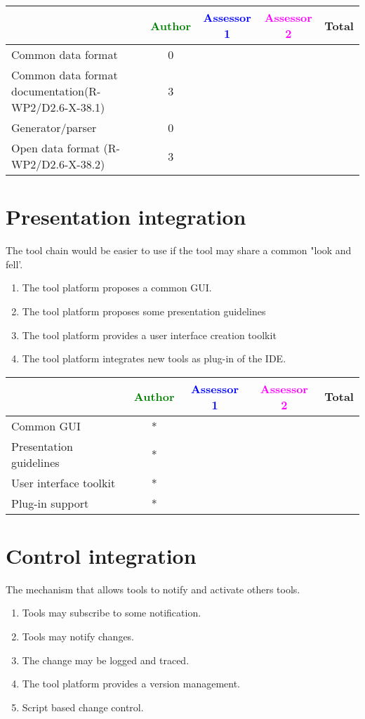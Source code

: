 \begin{tabular}{|l | c | c | c | c|} \hline
  & \textcolor{green}{Author} & \textcolor{blue}{Assessor 1} &  \textcolor{magenta}{Assessor 2} & Total \\
  \hline Common data format& 0
  &                 &                  &\\
  \hline Common data format documentation(R-WP2/D2.6-X-38.1) & 3
  &                 &                  &\\
  \hline Generator/parser & 0
  &                 &                  &\\
  \hline Open data format (R-WP2/D2.6-X-38.2)& 3
  &                 &                  &\\
  \hline
\end{tabular}



\section{Presentation integration}
The tool chain would be easier to use if the tool may share a common
"look and fell'.
\begin{enumerate}
\item The tool platform proposes a common \gls{GUI}.
\item The tool platform proposes some presentation guidelines
\item The tool platform provides a user interface creation toolkit
\item The tool platform integrates new tools as plug-in of the \gls{IDE}.
\end{enumerate}

\begin{tabular}{|l | c | c | c | c|} \hline
  & \textcolor{green}{Author} & \textcolor{blue}{Assessor 1} &  \textcolor{magenta}{Assessor 2} & Total \\
  \hline Common \gls{GUI}& *
  &                 &                  &\\
  \hline Presentation guidelines &*
  &                 &                  &\\
  \hline User interface toolkit &*
  &                 &                  &\\
  \hline Plug-in support &*
  &                 &                  &\\
  \hline
\end{tabular}



\section{Control integration}
The mechanism that allows tools to notify and activate others tools.
\begin{enumerate}
\item Tools may subscribe to some notification.
\item Tools may notify changes.
\item The change may be logged and traced.
\item The tool platform provides a version management.
\item Script based change control.
\end{enumerate}

